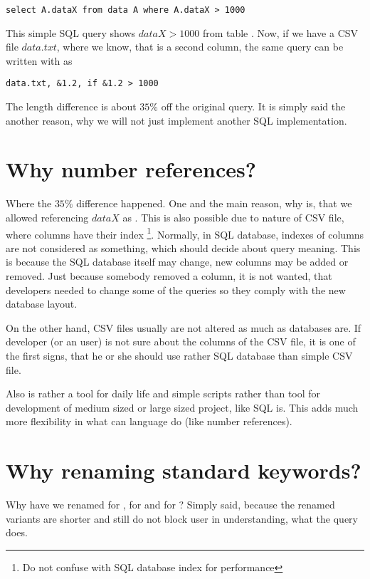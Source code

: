 \begin{verbatim}
select A.dataX from data A where A.dataX > 1000
\end{verbatim}

This simple SQL query shows $dataX > 1000$ from table . 
Now, if we have a CSV file $data.txt$, where we know, that  is a second column, the same query can 
be written with  as

\begin{verbatim}
data.txt, &1.2, if &1.2 > 1000
\end{verbatim}

The length difference is about $35\%$ off the original query. It is simply said the another reason, 
why we will not just implement another SQL implementation.

\section{Why number references?}
Where the $35\%$ difference happened. One and the main reason, why is, that we allowed referencing $dataX$ as .
This is also possible due to nature of CSV file, where columns have their index
\footnote{Do not confuse with SQL database index for performance}. 
Normally, in SQL database, indexes of columns are not considered as something, which should decide about query meaning.
This is because the SQL database itself may change, new columns may be added or removed. Just because somebody removed a column, 
it is not wanted, that developers needed to change some of the queries so they comply with the new database layout.

On the other hand, CSV files usually are not altered as much as databases are. 
If developer (or an user) is not sure about the columns of the CSV file, it is one of the first signs, that
he or she should use rather SQL database than simple CSV file.

Also  is rather a tool for daily life and simple scripts rather than tool for development of medium sized or
large sized project, like SQL is. This adds much more flexibility in what can language do (like number references).

\section{Why renaming standard keywords?}
Why have we renamed  for ,  for  and  for ? Simply said, because the renamed variants are shorter and still do not block user in understanding, what the query does.

